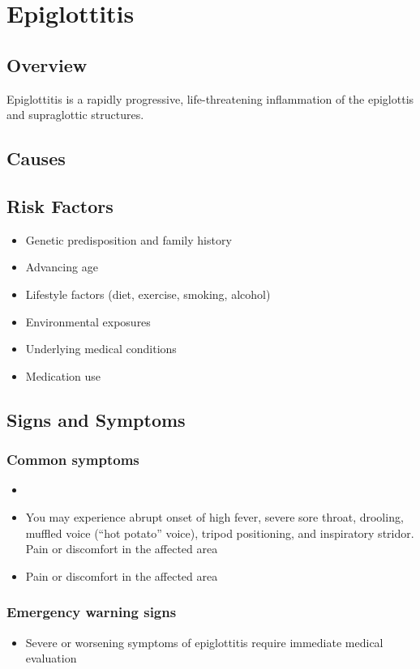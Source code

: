 \chapter{Epiglottitis}
\label{sec:Epiglottitis}

\section{Overview}
Epiglottitis is a rapidly progressive, life-threatening inflammation of the epiglottis and supraglottic structures.
\section{Causes}
\section{Risk Factors}

\begin{itemize}[noitemsep]
  \item Genetic predisposition and family history
  \item Advancing age
  \item Lifestyle factors (diet, exercise, smoking, alcohol)
  \item Environmental exposures
  \item Underlying medical conditions
  \item Medication use
\end{itemize}
\section{Signs and Symptoms}

\subsection{Common symptoms}
\begin{itemize}[noitemsep]
  \item \item You may experience abrupt onset of high fever, severe sore throat, drooling, muffled voice (``hot potato'' voice), tripod positioning, and inspiratory stridor. Pain or discomfort in the affected area    \item Pain or discomfort in the affected area
  \end{itemize}

\subsection{Emergency warning signs}
\begin{itemize}[noitemsep]
  \item Severe or worsening symptoms of epiglottitis require immediate medical evaluation
\end{itemize}
